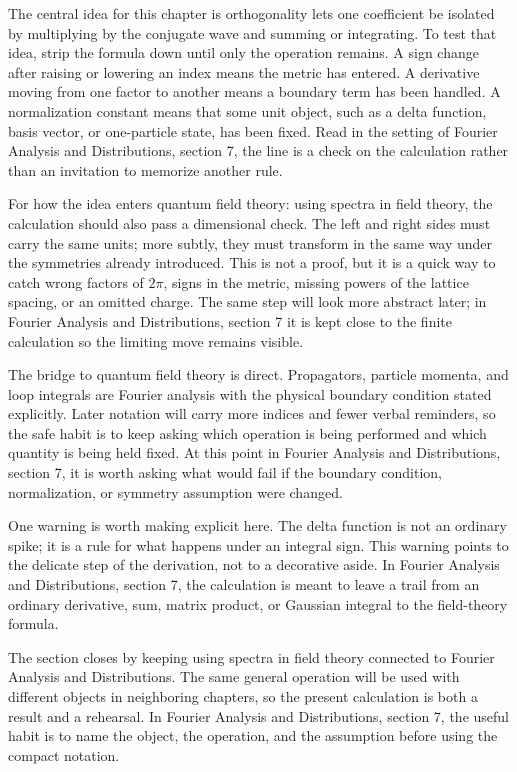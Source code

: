 The central idea for this chapter is orthogonality lets one coefficient be isolated by multiplying by the conjugate wave and summing or integrating.  To test that idea, strip the formula down until only the operation remains.  A sign change after raising or lowering an index means the metric has entered.  A derivative moving from one factor to another means a boundary term has been handled.  A normalization constant means that some unit object, such as a delta function, basis vector, or one-particle state, has been fixed.  Read in the setting of Fourier Analysis and Distributions, section 7, the line is a check on the calculation rather than an invitation to memorize another rule.

For how the idea enters quantum field theory: using spectra in field theory, the calculation should also pass a dimensional check.  The left and right sides must carry the same units; more subtly, they must transform in the same way under the symmetries already introduced.  This is not a proof, but it is a quick way to catch wrong factors of \(2\pi\), signs in the metric, missing powers of the lattice spacing, or an omitted charge.  The same step will look more abstract later; in Fourier Analysis and Distributions, section 7 it is kept close to the finite calculation so the limiting move remains visible.

The bridge to quantum field theory is direct.  Propagators, particle momenta, and loop integrals are Fourier analysis with the physical boundary condition stated explicitly.  Later notation will carry more indices and fewer verbal reminders, so the safe habit is to keep asking which operation is being performed and which quantity is being held fixed.  At this point in Fourier Analysis and Distributions, section 7, it is worth asking what would fail if the boundary condition, normalization, or symmetry assumption were changed.

One warning is worth making explicit here.  The delta function is not an ordinary spike; it is a rule for what happens under an integral sign.  This warning points to the delicate step of the derivation, not to a decorative aside.  In Fourier Analysis and Distributions, section 7, the calculation is meant to leave a trail from an ordinary derivative, sum, matrix product, or Gaussian integral to the field-theory formula.

The section closes by keeping using spectra in field theory connected to Fourier Analysis and Distributions.  The same general operation will be used with different objects in neighboring chapters, so the present calculation is both a result and a rehearsal.  In Fourier Analysis and Distributions, section 7, the useful habit is to name the object, the operation, and the assumption before using the compact notation.




